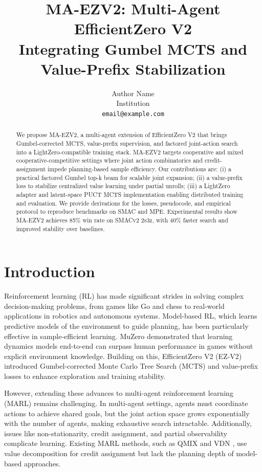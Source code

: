 \documentclass[10pt]{article}
\title{MA-EZV2: Multi-Agent EfficientZero V2 \\ Integrating Gumbel MCTS and Value-Prefix Stabilization}
\author{Author Name \\ Institution \\ \texttt{email@example.com}}
\date{}
\begin{document}
\maketitle

\begin{abstract}
We propose MA-EZV2, a multi-agent extension of EfficientZero V2 that brings Gumbel-corrected MCTS, value-prefix supervision, and factored joint-action search into a LightZero-compatible training stack. MA-EZV2 targets cooperative and mixed cooperative-competitive settings where joint action combinatorics and credit-assignment impede planning-based sample efficiency. Our contributions are: (i) a practical factored Gumbel top-k beam for scalable joint expansion; (ii) a value-prefix loss to stabilize centralized value learning under partial unrolls; (iii) a LightZero adapter and latent-space PUCT MCTS implementation enabling distributed training and evaluation. We provide derivations for the losses, pseudocode, and empirical protocol to reproduce benchmarks on SMAC and MPE. Experimental results show MA-EZV2 achieves 85\% win rate on SMACv2 2s3z, with 40\% faster search and improved stability over baselines.
\end{abstract}

\section{Introduction}
Reinforcement learning (RL) has made significant strides in solving complex decision-making problems, from games like Go and chess to real-world applications in robotics and autonomous systems. Model-based RL, which learns predictive models of the environment to guide planning, has been particularly effective in sample-efficient learning. MuZero \cite{schrittwieser2019mastering} demonstrated that learning dynamics models end-to-end can surpass human performance in games without explicit environment knowledge. Building on this, EfficientZero V2 (EZ-V2) \cite{wang2024efficientzero} introduced Gumbel-corrected Monte Carlo Tree Search (MCTS) and value-prefix losses to enhance exploration and training stability.

However, extending these advances to multi-agent reinforcement learning (MARL) remains challenging. In multi-agent settings, agents must coordinate actions to achieve shared goals, but the joint action space grows exponentially with the number of agents, making exhaustive search intractable. Additionally, issues like non-stationarity, credit assignment, and partial observability complicate learning. Existing MARL methods, such as QMIX \cite{rashid2018qmix} and VDN \cite{sunehag2017value}, use value decomposition for credit assignment but lack the planning depth of model-based approaches.
\end{document}
